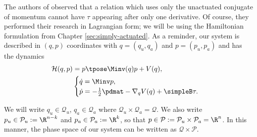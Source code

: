 The authors of
\cite{nhvc_dynamic_walking,hybrid_zero_dynamics_bipedal_nhvcs,nhvc_incline_walking}
observed that a relation which uses only the unactuated conjugate of momentum
cannot have \(\tau\) appearing after only one derivative. Of course,
they performed their research in Lagrangian form; we will be using
the Hamiltonian formulation from Chapter \ref{sec:simply-actuated}.
As a reminder, our system is described in \((q,p)\) coordinates with 
\(q = (q_u,q_a)\) and \(p = (p_u, p_a)\) and has the dynamics
\begin{align}\label{eqn:simply-actuated-hamiltonian}
    \mathcal{H}(q,p) &= p\tpose \Minv(q) p + V(q)
    , \\
    \label{eqn:simply-actuated-dynamics}
    &\begin{cases}
       \dot{q} = \Minv p 
       ,\\
       \dot{p} = -\frac{1}{2} \pdmat - \nabla_q V(q) + \simpleB \tau 
       .\\
    \end{cases}
\end{align}

\begin{notation}
    We will write \(q_u \in \mathcal{Q}_u\), \(q_a \in \mathcal{Q}_a\) where
    \(\mathcal{Q}_u \times \mathcal{Q}_a = \mathcal{Q}\). 
    We also write
    \(p_u \in \mathcal{P}_u := \R^{n-k}\) and 
    \(p_a \in \mathcal{P}_a := \R^k\), so that 
    \(p \in \mathcal{P} := \mathcal{P}_u \times \mathcal{P}_a = \R^n\). 
    In this manner, the phase space of our system can be written as
    \(\mathcal{Q} \times \mathcal{P}\).
\end{notation}

